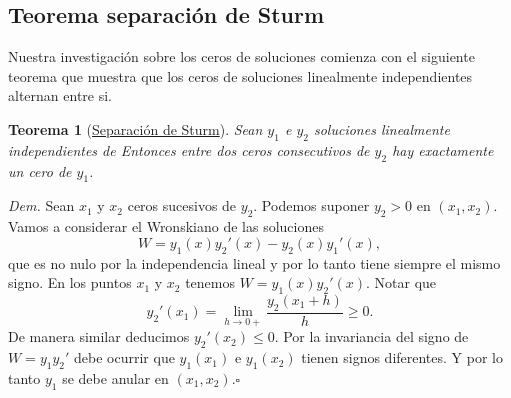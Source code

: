 \documentclass{article}
\newenvironment{demo}{\noindent\emph{Dem.}}{{\hspace*{\fill}$\square$} \newline\vspace{5pt}}
\newtheorem{teorema}{Teorema}[section]
\begin{document}
\subsection{Teorema separación de Sturm}

Nuestra investigación sobre los ceros de soluciones comienza con el siguiente teorema que muestra que los ceros de soluciones linealmente independientes alternan entre si.




\begin{teorema}[\href{http://en.wikipedia.org/wiki/Sturm_separation_theorem}{Separación de Sturm}]\label{sep_sturm} Sean $y_1$ e $y_2$ soluciones linealmente independientes de 
Entonces entre dos ceros consecutivos de $y_2$ hay exactamente un cero de $y_1$. \end{teorema}
\begin{demo} Sean $x_1$ y $x_2$ ceros sucesivos de $y_2$. Podemos suponer $y_2>0$ en $(x_1,x_2)$. Vamos a considerar el Wronskiano de las soluciones
\[W=y_1(x)y_2'(x)-y_2(x)y_1'(x),\]
que es no nulo por la independencia lineal y por lo tanto tiene siempre el  mismo signo. En los puntos $x_1$ y $x_2$ tenemos $W=y_1(x)y_2'(x)$. Notar que
\[y_2'(x_1)=\lim_{h\to 0+}\frac{y_2(x_1+h)}{h}\geq 0.\]
De  manera similar deducimos $y_2'(x_2)\leq 0$. Por la invariancia del signo de $W=y_1y_2'$ debe ocurrir que $y_1(x_1)$ e $y_1(x_2)$ tienen signos diferentes. Y por lo tanto $y_1$ se debe anular en $(x_1,x_2)$.\end{demo}
\end{document}
